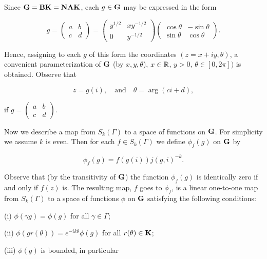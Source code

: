 Since $\mathbf{G} = \mathbf{B}\mathbf{K} = \mathbf{N}\mathbf{A}\mathbf{K}$, each $g \in \mathbf{G}$ may be expressed in the form

\begin{equation}\label{eq:2.1}
g = \begin{pmatrix} a & b \\ c & d \end{pmatrix} = \begin{pmatrix} y^{1/2} & xy^{-1/2} \\ 0 & y^{-1/2} \end{pmatrix} \begin{pmatrix} \cos\theta & -\sin\theta \\ \sin\theta & \cos\theta \end{pmatrix}.\tag{2.1}
\end{equation}

Hence, assigning to each $g$ of this form the coordinates $(z = x + iy, \theta)$, a convenient parameterization of $\mathbf{G}$ (by $x, y, \theta$), $x \in \mathbb{R}$, $y > 0$, $\theta \in [0, 2\pi])$ is obtained. Observe that

\begin{equation}\label{eq:2.2}
z = g(i), \quad \text{and} \quad \theta = \arg(ci + d),\tag{2.2}
\end{equation}

if $g = \begin{pmatrix} a & b \\ c & d \end{pmatrix}$.

Now we describe a map from $S_k(\Gamma)$ to a space of functions on $\mathbf{G}$. For simplicity we assume $k$ is even. Then for each $f \in S_k(\Gamma)$ we define $\phi_f(g)$ on $\mathbf{G}$ by

\begin{equation}\label{eq:2.3}
\phi_f(g) = f(g(i)) j(g,i)^{-k}.\tag{2.3}
\end{equation}

Observe that (by the transitivity of $\mathbf{G}$) the function $\phi_f(g)$ is identically zero if and only if $f(z)$ is. The resulting map, $f$ goes to $\phi_f$, is a linear one-to-one map from $S_k(\Gamma)$ to a space of functions $\phi$ on $\mathbf{G}$ satisfying the following conditions:

(i) $\phi(\gamma g) = \phi(g)$ for all $\gamma \in \Gamma$;

(ii) $\phi(gr(\theta)) = e^{-ik\theta}\phi(g)$ for all $r(\theta) \in \mathbf{K}$;

(iii) $\phi(g)$ is bounded, in particular

